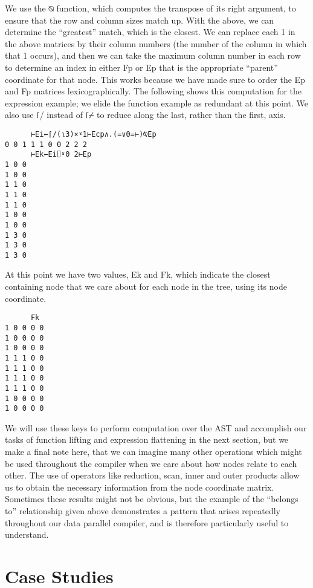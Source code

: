 \documentclass[pldi]{sigplanconf-pldi15}
\begin{document}
We use the ⍉ function, which computes the transpose of its right argument, to ensure that the row 
and column sizes match up. With the above, we can determine the “greatest” match, which is the closest. 
We can replace each 1 in the above matrices by their column numbers (the number of the column in which 
that 1 occurs), and then we can take the maximum column number in each row to determine an index in 
either Fp or Ep that is the appropriate “parent” coordinate for that node. This works because we have 
made sure to order the Ep and Fp matrices lexicographically. The following shows this computation for 
the expression example; we elide the function example as redundant at this point. We also use ⌈/ instead 
of ⌈⌿ to reduce along the last, rather than the first, axis. 

\begin{verbatim}
      ⊢Ei←⌈/(⍳3)×⍤1⊢Ecp∧.(=∨0=⊢)⍉Ep
0 0 1 1 1 0 0 2 2 2
      ⊢Ek←Ei⌷⍤0 2⊢Ep 
1 0 0
1 0 0
1 1 0
1 1 0
1 1 0
1 0 0
1 0 0
1 3 0
1 3 0
1 3 0
\end{verbatim}

At this point we have two values, Ek and Fk, which indicate the closest containing node that we care about 
for each node in the tree, using its node coordinate. 

\begin{verbatim}
      Fk
1 0 0 0 0
1 0 0 0 0
1 0 0 0 0
1 1 1 0 0
1 1 1 0 0
1 1 1 0 0
1 1 1 0 0
1 0 0 0 0
1 0 0 0 0
\end{verbatim}

We will use these keys to perform computation over the AST and accomplish our tasks of function lifting and 
expression flattening in the next section, but we make a final note here, that we can imagine many other 
operations which might be used throughout the compiler when we care about how nodes relate to each 
other. The use of operators like reduction, scan, inner and outer products allow us to obtain the necessary 
information from the node coordinate matrix. Sometimes these results might not be obvious, but the 
example of the “belongs to” relationship given above demonstrates a pattern that arises repeatedly 
throughout our data parallel compiler, and is therefore particularly useful to understand. 

\section{Case Studies}

\end{document}
